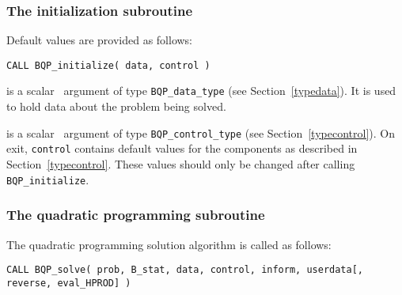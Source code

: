 \documentclass{galahad}
\newcommand{\packagename}{BQP}
\begin{document}

\subsubsection{The initialization subroutine}\label{subinit}
 Default values are provided as follows:
\vspace*{1mm}

\hspace{8mm}
{\tt CALL \packagename\_initialize( data, control )}

\vspace*{-3mm}
\begin{description}

 is a scalar \intentinout\ argument of type 
{\tt \packagename\_data\_type}
(see Section~\ref{typedata}). It is used to hold data about the problem being 
solved. 

 is a scalar \intentout\ argument of type 
{\tt \packagename\_control\_type}
(see Section~\ref{typecontrol}). 
On exit, {\tt control} contains default values for the components as
described in Section~\ref{typecontrol}.
These values should only be changed after calling 
{\tt \packagename\_initialize}.

\end{description}


\subsubsection{The quadratic programming subroutine}\label{qps}
The quadratic programming solution algorithm is called as follows:
\vspace*{1mm}

\hspace{8mm}
{\tt CALL \packagename\_solve( prob, B\_stat, data, control, inform, userdata[,
reverse, eval\_HPROD] )}           
%
\end{document}
